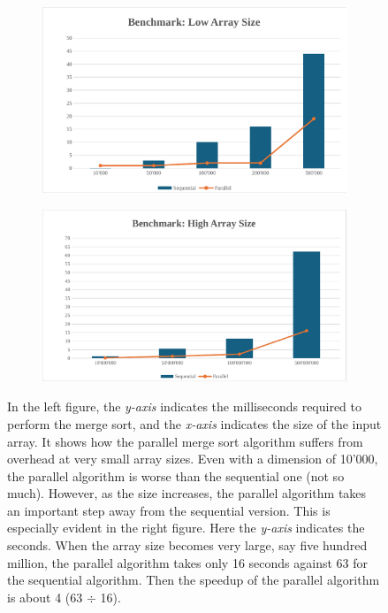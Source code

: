 \documentclass[a4paper]{article}
\begin{document}
    \begin{figure}[!htp]
        \centering
        \begin{subfigure}{.46\textwidth}
            \centering
            \includegraphics[width=\textwidth]{../benchmark/benchmark-low-array-size.pdf}
        \end{subfigure}
        \begin{subfigure}{.50\textwidth}
            \centering
            \includegraphics[width=\textwidth]{../benchmark/benchmark-high-array-size.pdf}
        \end{subfigure}
        \caption{In the left figure, the \emph{y-axis} indicates the milliseconds required to perform the merge sort, and the \emph{x-axis} indicates the size of the input array. It shows how the parallel merge sort algorithm suffers from overhead at very small array sizes. Even with a dimension of 10'000, the parallel algorithm is worse than the sequential one (not so much). However, as the size increases, the parallel algorithm takes an important step away from the sequential version. This is especially evident in the right figure. Here the \emph{y-axis} indicates the seconds. When the array size becomes very large, say five hundred million, the parallel algorithm takes only 16 seconds against 63 for the sequential algorithm. Then the speedup of the parallel algorithm is about 4 (63 $\div$ 16).}
    \end{figure}
\end{document}
